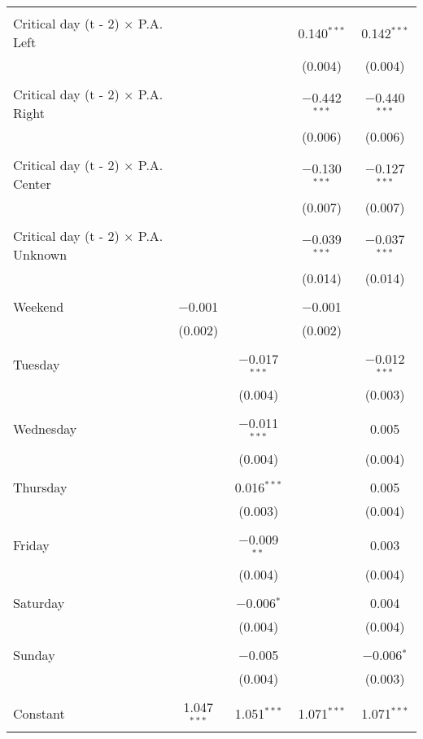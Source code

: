\documentclass[
]{article}
\begin{document}
\begin{table}[!htbp]
{\begin{tabular}{@{\extracolsep{5pt}}lcccc}
  & & & & \\ 
 Critical day (t - 2) $\times$ P.A. Left &  &  & 0.140$^{***}$ & 0.142$^{***}$ \\ 
  &  &  & (0.004) & (0.004) \\ 
  & & & & \\ 
 Critical day (t - 2) $\times$ P.A. Right &  &  & $-$0.442$^{***}$ & $-$0.440$^{***}$ \\ 
  &  &  & (0.006) & (0.006) \\ 
  & & & & \\ 
 Critical day (t - 2) $\times$ P.A. Center &  &  & $-$0.130$^{***}$ & $-$0.127$^{***}$ \\ 
  &  &  & (0.007) & (0.007) \\ 
  & & & & \\ 
 Critical day (t - 2) $\times$ P.A. Unknown &  &  & $-$0.039$^{***}$ & $-$0.037$^{***}$ \\ 
  &  &  & (0.014) & (0.014) \\ 
  & & & & \\ 
 Weekend & $-$0.001 &  & $-$0.001 &  \\ 
  & (0.002) &  & (0.002) &  \\ 
  & & & & \\ 
 Tuesday &  & $-$0.017$^{***}$ &  & $-$0.012$^{***}$ \\ 
  &  & (0.004) &  & (0.003) \\ 
  & & & & \\ 
 Wednesday &  & $-$0.011$^{***}$ &  & 0.005 \\ 
  &  & (0.004) &  & (0.004) \\ 
  & & & & \\ 
 Thursday &  & 0.016$^{***}$ &  & 0.005 \\ 
  &  & (0.003) &  & (0.004) \\ 
  & & & & \\ 
 Friday &  & $-$0.009$^{**}$ &  & 0.003 \\ 
  &  & (0.004) &  & (0.004) \\ 
  & & & & \\ 
 Saturday &  & $-$0.006$^{*}$ &  & 0.004 \\ 
  &  & (0.004) &  & (0.004) \\ 
  & & & & \\ 
 Sunday &  & $-$0.005 &  & $-$0.006$^{*}$ \\ 
  &  & (0.004) &  & (0.003) \\ 
  & & & & \\ 
 Constant & 1.047$^{***}$ & 1.051$^{***}$ & 1.071$^{***}$ & 1.071$^{***}$ \\ 

\end{tabular}}
\end{table}
\end{document}
